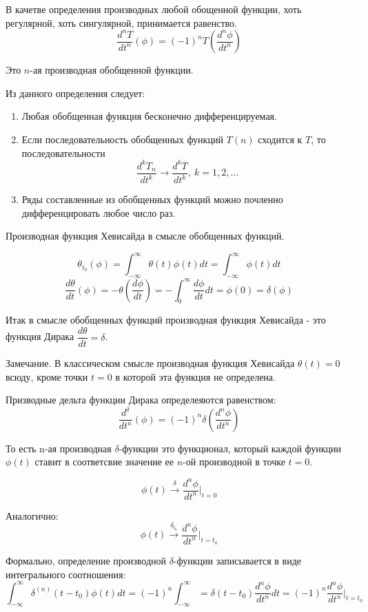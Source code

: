 \documentclass[14pt,a4paper]{extarticle}
\theoremstyle{definition}
\theoremstyle{remark}
\renewcommand{\[}{\begin{dmath*}[compact]}
\renewcommand{\]}{\end{dmath*}}
\newcommand{\be}{\begin{enumerate}}
\newcommand{\ee}{\end{enumerate}}
\newcommand{\sep}{ , \ \allowbreak }
\newcommand\fr[2]{\dfrac{#1}{#2}}
\begin{document}
В качетве определения производных любой обощенной функции,
хоть регулярной, хоть сингулярной, принимается равенство.
\[\fr{d^nT}{dt^n}(\phi) = (-1)^n T\left(\fr{d^n\phi}{dt^n}\right)\]

Это $n$-ая производная обобщенной функции.

Из данного определения следует:
\be
  \item Любая обобщенная функция бесконечно дифференцируемая.

  \item Если последовательность обобщенных функций $T(n)$ сходится к $T$,
  то последовательности
  \[\fr{d^kT_n}{dt^k}\to \fr{d^kT}{dt^k}\sep k=1,2,\dots\]

  \item Ряды составленные из обобщенных функций можно почленно
  дифференцировать любое число раз.
\ee

Производная функция Хевисайда в смысле обобщенных функций.

\[\theta_{t_0} (\phi) = \int_{-\infty}^\infty \theta (t)\phi(t) dt
= \int_{-\infty}^\infty \phi(t)dt\]
\[\fr{d\theta}{dt}(\phi) = -\theta\left(\fr{d\phi}{dt}\right)
= - \int_{0}^\infty\fr{d\phi}{dt}dt = \phi(0) = \delta(\phi)\]

Итак в смысле обобщенных функций производная функция Хевисайда - это
функция Дирака $\fr{d\theta}{dt} = \delta$.

Замечание. В классическом смысле производная функция Хевисайда
$\theta(t) = 0$ всюду, кроме точки $t=0$ в которой эта функция не определена.

Призводные дельта функции Дирака определеяются равенством:
\[\fr{d^\delta}{dt^n} (\phi)
= (-1)^n \delta\left(\fr{d^n\phi}{dt^n}\right)\]

То есть n-ая производная $\delta$-функции это функционал,
который каждой функции $\phi(t)$ ставит в соответсвие значение ее
$n$-ой производной в точке $t=0$.

\[\phi(t) \overset{\delta}{\to} \fr{d^n\phi}{dt^n} \Big|_{t=0}\]

Аналогично:
\[\phi(t) \overset{\delta_{t_0}}{\to} \fr{d^n\phi}{dt^n} \Big|_{t=t_0}\]


Формально, определение производной $\delta$-функции записывается
в виде интегрального соотношения:
\[\int_{-\infty}^\infty \delta^{(n)} (t-t_0)\phi(t)dt
=(-1)^n\int_{-\infty}^\infty=\delta(t-t_0) \fr{d^n \phi}{dt^n}dt
=(-1)^n\fr{d^n\phi}{dt^n}\Big|_{t=t_0}\]

\listoftheorems
\end{document}
